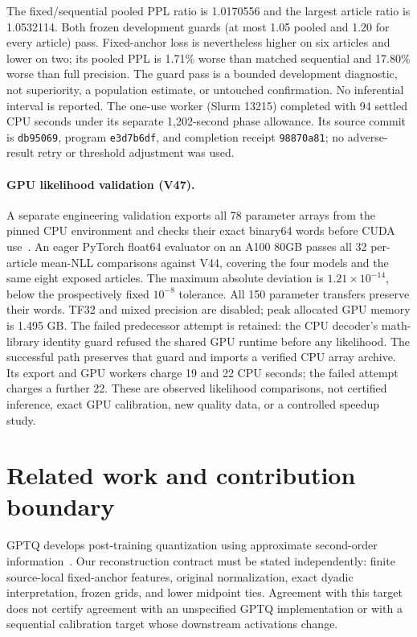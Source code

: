 \documentclass[10pt,twocolumn,letterpaper]{article}
\begin{document}
The fixed/sequential pooled PPL ratio is 1.0170556 and the largest article ratio
is 1.0532114. Both frozen development guards (at most 1.05 pooled and 1.20 for
every article) pass. Fixed-anchor loss is nevertheless higher on six articles
and lower on two; its pooled PPL is 1.71\% worse than matched sequential and
17.80\% worse than full precision. The guard pass is a bounded development
diagnostic, not superiority, a population estimate, or untouched confirmation.
No inferential interval is reported. The one-use worker (Slurm 13215) completed
with 94 settled CPU seconds under its separate 1,202-second phase allowance.
Its source commit is \texttt{db95069}, program \texttt{e3d7b6df}, and completion
receipt \texttt{98870a81}; no adverse-result retry or threshold adjustment was
used.

\paragraph{GPU likelihood validation (V47).}
A separate engineering validation exports all 78 parameter arrays from the pinned
CPU environment and checks their exact binary64 words before CUDA use~\cite{v47}.
An eager PyTorch float64 evaluator on an A100 80GB passes all 32 per-article
mean-NLL comparisons against V44, covering the four models and the same eight
exposed articles. The maximum absolute deviation is $1.21\times10^{-14}$,
below the prospectively fixed $10^{-8}$ tolerance. All 150 parameter transfers
preserve their words. TF32 and mixed precision are disabled; peak allocated GPU
memory is 1.495 GB. The failed predecessor attempt is retained: the CPU decoder's
math-library identity guard refused the shared GPU runtime before any likelihood.
The successful path preserves that guard and imports a verified CPU array archive.
Its export and GPU workers charge 19 and 22 CPU seconds; the failed attempt
charges a further 22. These are observed likelihood comparisons, not certified
inference, exact GPU calibration, new quality data, or a controlled speedup study.

\section{Related work and contribution boundary}
GPTQ develops post-training quantization using approximate second-order
information~\cite{gptq}. Our reconstruction contract must be stated independently:
finite source-local fixed-anchor features, original normalization, exact dyadic
interpretation, frozen grids, and lower midpoint ties. Agreement with this target
does not certify agreement with an unspecified GPTQ implementation or with a
sequential calibration target whose downstream activations change.
\end{document}
